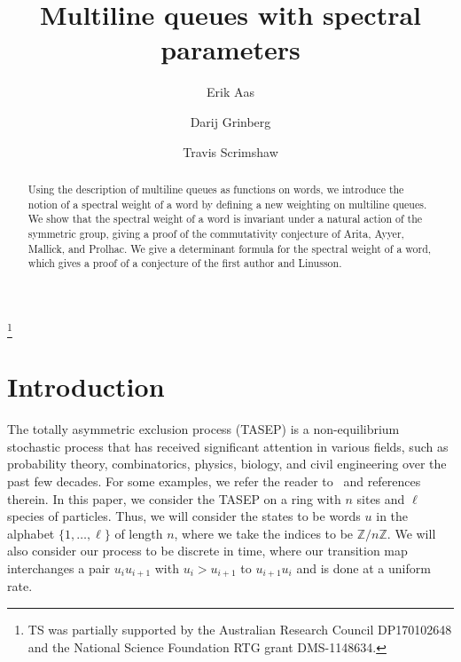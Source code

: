 \documentclass[reqno]{amsart}
\newcommand{\0}{\phantom{c}}
\newcommand{\ZZ}{\mathbb{Z}}
\theoremstyle{plain}
\theoremstyle{definition}
\numberwithin{equation}{section}
\begin{document}
\title[MLQs]{Multiline queues with spectral parameters}

\author[E.~Aas]{Erik Aas}
\address[E. Aas]{Department of Mathematics, Pennsylvania State University, McAllister Building, State College, PA 116802, USA}

\author[D.~Grinberg]{Darij Grinberg}
\address[D. Grinberg]{School of Mathematics, University of Minnesota, 206 Church St. SE, Minneapolis, MN 55455}

\author[T.~Scrimshaw]{Travis Scrimshaw}
\address[T. Scrimshaw]{School of Mathematics and Physics, University of Queensland, St. Lucia, QLD 4072, Australia}


\thanks{TS was partially supported by the Australian Research Council DP170102648 and the National Science Foundation RTG grant DMS-1148634.}

\begin{abstract}
Using the description of multiline queues as functions on words, we introduce the notion of a spectral weight of a word by defining a new weighting on multiline queues.
We show that the spectral weight of a word is invariant under a natural action of the symmetric group, giving a proof of the commutativity conjecture of Arita, Ayyer, Mallick, and Prolhac.
We give a determinant formula for the spectral weight of a word, which gives a proof of a conjecture of the first author and Linusson.
\end{abstract}

\maketitle

\section{Introduction}
\label{sec:introduction}

The totally asymmetric exclusion process (TASEP) is a non-equilibrium stochastic process  that has received significant attention in various fields, such as probability theory, combinatorics, physics, biology, and civil engineering over the past few decades.
For some examples, we refer the reader to~\cite{AasLin17,AAMP,BE07,BP14,DEHP93,KMO15,KMO16} and references therein.
In this paper, we consider the TASEP on a ring with $n$ sites and $\ell$ species of particles.
Thus, we will consider the states to be words $u$ in the alphabet $\{1, \dotsc, \ell\}$ of length $n$, where we take the indices to be $\ZZ / n \ZZ$.
We will also consider our process to be discrete in time, where our transition map interchanges a pair $u_i u_{i+1}$ with $u_i > u_{i+1}$ to $u_{i+1} u_i$ and is done at a uniform rate.
\end{document}
